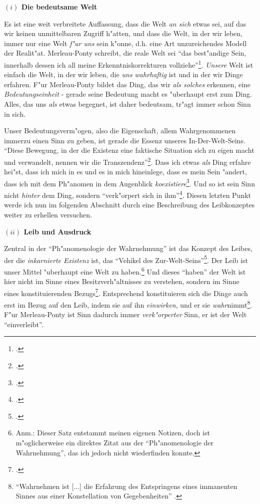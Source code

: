 \documentclass[a4paper, 12pt]{article}
\begin{document}
\begin{onehalfspace}
\vspace{5mm}

\noindent\textbf{$(i)$ Die bedeutsame Welt}

\noindent Es ist eine weit verbreitete Auffassung, dass die Welt \emph{an sich} etwas sei, auf das wir keinen unmittelbaren Zugriff h"atten, und dass die Welt, in der wir leben, immer nur eine Welt \emph{f"ur uns} sein k"onne, d.h. eine Art unzureichendes Modell der Realit"at. Merleau-Ponty schreibt, die reale Welt sei "`das best"andige Sein, innerhalb dessen ich all meine Erkenntniskorrekturen vollziehe"'\footnote{\Cite[S. 379]{merleau1966phanomenologie}.}. \emph{Unsere} Welt ist einfach die Welt, in der wir leben, die \emph{uns wahrhaftig} ist und in der wir Dinge erfahren. F"ur Merleau-Ponty bildet das Ding, das wir \emph{als solches} erkennen, eine \emph{Bedeutungseinheit} - gerade seine Bedeutung macht es "uberhaupt erst zum Ding. Alles, das uns \emph{als} etwas begegnet, ist daher bedeutsam, tr"agt immer schon Sinn in sich.

Unser Bedeutungsverm"ogen, also die Eigenschaft, allem Wahrgenommenen immerzu einen Sinn zu geben, ist gerade die Essenz unseres In-Der-Welt-Seins. "`Diese Bewegung, in der die Existenz eine faktische Situation sich zu eigen macht und verwandelt, nennen wir die Transzendenz"'\footnote{\Cite[S. 202]{merleau1966phanomenologie}.}. Dass ich etwas \emph{als} Ding erfahre hei"st, dass ich mich in es und es in mich hineinlege, dass es mein Sein "andert, dass ich mit dem Ph"anomen in dem Augenblick \emph{koexistiere}\footnote{\Cite[Vgl.][S. 368]{merleau1966phanomenologie}.}. Und so ist sein Sinn nicht \emph{hinter} dem Ding, sondern "`verk"orpert sich in ihm"'\footnote{\Cite[S. 370]{merleau1966phanomenologie}.}. Diesen letzten Punkt werde ich nun im folgenden Abschnitt durch eine Beschreibung des Leibkonzeptes weiter zu erhellen versuchen. 

\vspace{5mm}

\noindent\textbf{$(ii)$ Leib und Ausdruck}

\noindent Zentral in der "`Ph"anomenologie der Wahrnehmung"' ist das Konzept des Leibes, der die \emph{inkarnierte Existenz} ist, das "`Vehikel des Zur-Welt-Seins"'\footnote{\Cite[S. 106]{merleau1966phanomenologie}.}. Der Leib ist unser Mittel "uberhaupt eine Welt zu haben.\footnote{Anm.: Dieser Satz entstammt meinen eigenen Notizen, doch ist m"oglicherweise ein direktes Zitat aus der "`Ph"anomenologie der Wahrnehmung"', das ich jedoch nicht wiederfinden konnte.} Und dieses "`haben"' der Welt ist hier nicht im Sinne eines Besitzverh"altnisses zu verstehen, sondern im Sinne eines konstituierenden Bezugs\footnote{\Cite[Vgl.][S. 207]{merleau1966phanomenologie}.}. Entsprechend konstituieren sich die Dinge auch erst im Bezug auf den Leib, indem sie auf ihn \emph{einwirken}, und er sie \emph{wahr}nimmt\footnote{"`Wahrnehmen ist [...] die Erfahrung des Entspringens eines immanenten Sinnes aus einer Konstellation von Gegebenheiten"' \citep[S. 42]{merleau1966phanomenologie}.}. F"ur Merleau-Ponty ist Sinn dadurch immer \emph{verk"orperter} Sinn, er ist der Welt "`einverleibt"'.


\end{onehalfspace}
\end{document}
